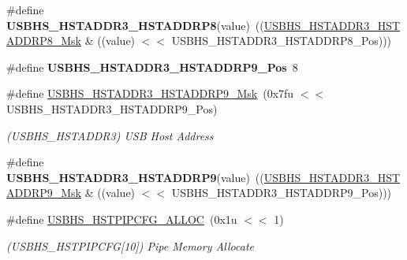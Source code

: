 \begin{DoxyCompactItemize}
\#define {\bfseries U\+S\+B\+H\+S\+\_\+\+H\+S\+T\+A\+D\+D\+R3\+\_\+\+H\+S\+T\+A\+D\+D\+R\+P8}(value)~((\mbox{\hyperlink{group__SAMV71__USBHS_gadea2e5a1320c92fb706cd154af7f626b}{U\+S\+B\+H\+S\+\_\+\+H\+S\+T\+A\+D\+D\+R3\+\_\+\+H\+S\+T\+A\+D\+D\+R\+P8\+\_\+\+Msk}} \& ((value) $<$$<$ U\+S\+B\+H\+S\+\_\+\+H\+S\+T\+A\+D\+D\+R3\+\_\+\+H\+S\+T\+A\+D\+D\+R\+P8\+\_\+\+Pos)))
\item 
\mbox{\label{group__SAME70__USBHS_ga236b909f99bdb298b43a699a82c9cc2c}} 
\#define {\bfseries U\+S\+B\+H\+S\+\_\+\+H\+S\+T\+A\+D\+D\+R3\+\_\+\+H\+S\+T\+A\+D\+D\+R\+P9\+\_\+\+Pos}~8
\item 
\mbox{\label{group__SAME70__USBHS_ga7441ecd79e733d277b037d6579a2fe36}} 
\#define \mbox{\hyperlink{group__SAME70__USBHS_ga7441ecd79e733d277b037d6579a2fe36}{U\+S\+B\+H\+S\+\_\+\+H\+S\+T\+A\+D\+D\+R3\+\_\+\+H\+S\+T\+A\+D\+D\+R\+P9\+\_\+\+Msk}}~(0x7fu $<$$<$ U\+S\+B\+H\+S\+\_\+\+H\+S\+T\+A\+D\+D\+R3\+\_\+\+H\+S\+T\+A\+D\+D\+R\+P9\+\_\+\+Pos)
\begin{DoxyCompactList}\small\item\em (U\+S\+B\+H\+S\+\_\+\+H\+S\+T\+A\+D\+D\+R3) U\+SB Host Address \end{DoxyCompactList}\item 
\mbox{\label{group__SAME70__USBHS_gad5adc5f70b973439c7dc46a65bfe24a3}} 
\#define {\bfseries U\+S\+B\+H\+S\+\_\+\+H\+S\+T\+A\+D\+D\+R3\+\_\+\+H\+S\+T\+A\+D\+D\+R\+P9}(value)~((\mbox{\hyperlink{group__SAMV71__USBHS_ga7441ecd79e733d277b037d6579a2fe36}{U\+S\+B\+H\+S\+\_\+\+H\+S\+T\+A\+D\+D\+R3\+\_\+\+H\+S\+T\+A\+D\+D\+R\+P9\+\_\+\+Msk}} \& ((value) $<$$<$ U\+S\+B\+H\+S\+\_\+\+H\+S\+T\+A\+D\+D\+R3\+\_\+\+H\+S\+T\+A\+D\+D\+R\+P9\+\_\+\+Pos)))
\item 
\mbox{\label{group__SAME70__USBHS_ga748a87e1440adf71b43858b99e3cc948}} 
\#define \mbox{\hyperlink{group__SAME70__USBHS_ga748a87e1440adf71b43858b99e3cc948}{U\+S\+B\+H\+S\+\_\+\+H\+S\+T\+P\+I\+P\+C\+F\+G\+\_\+\+A\+L\+L\+OC}}~(0x1u $<$$<$ 1)
\begin{DoxyCompactList}\small\item\em (U\+S\+B\+H\+S\+\_\+\+H\+S\+T\+P\+I\+P\+C\+FG\mbox{[}10\mbox{]}) Pipe Memory Allocate \end{DoxyCompactList}\item 
\mbox{\label{group__SAME70__USBHS_gab1f8218fe0338a75c16c89c69cb92356}} 

\end{DoxyCompactItemize}
